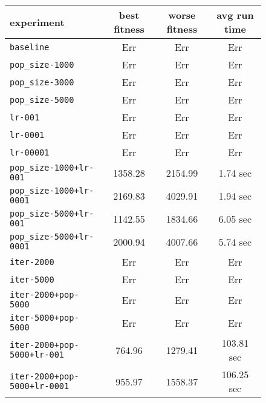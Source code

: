 \begin{figure}[htb]
	\centering
	
	\begin{tabular}{lccc}
		\toprule
		\textbf{experiment} & \textbf{best fitness} & \textbf{worse fitness} & \textbf{avg run time} \\
		\midrule
		\texttt{baseline 						} &	   Err &	    Err &	       Err \\
		\texttt{pop\_size-1000 					}    &	   Err &	    Err &	       Err \\
		\texttt{pop\_size-3000 					}    &	   Err &	    Err &	       Err \\
		\texttt{pop\_size-5000 					}    &	   Err &	    Err &	       Err \\
		\texttt{lr-001 							}   &	   Err &	    Err &	       Err \\
		\texttt{lr-0001	 						}  &	   Err &	    Err &	       Err \\
		\texttt{lr-00001	 					} &	   Err &	    Err &	       Err \\
		\texttt{pop\_size-1000+lr-001 			} &              1358.28 &	2154.99 &	  1.74 sec \\
		\texttt{pop\_size-1000+lr-0001 			} &              2169.83 &	4029.91 &	  1.94 sec \\
		\texttt{pop\_size-5000+lr-001 			} &              1142.55 &	1834.66 &	  6.05 sec \\
		\texttt{pop\_size-5000+lr-0001 			} &              2000.94 &	4007.66 &	  5.74 sec \\
		\texttt{iter-2000 						}  &	   Err &	    Err &	       Err \\
		\texttt{iter-5000 						}  &	   Err &	    Err &	       Err \\
		\texttt{iter-2000+pop-5000 	}			  &	   Err &	    Err &	       Err \\
		\texttt{iter-5000+pop-5000 	}			  &	   Err &	    Err &	       Err \\
		\texttt{iter-2000+pop-5000+lr-001 }		  &	764.96 &	1279.41 &	103.81 sec \\
		\texttt{iter-2000+pop-5000+lr-0001 }	  &	955.97 &	1558.37 &	106.25 sec \\
		\bottomrule
	\end{tabular}
	\label{tab:nes-performance-r}
\end{figure}

